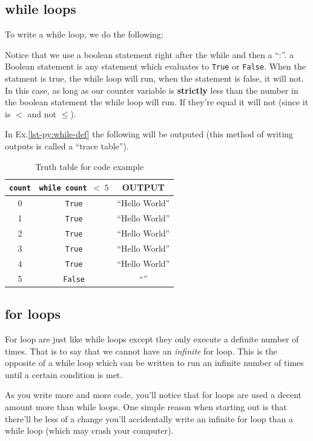 \documentclass[12pt,a4paper]{book}
\begin{document}
				\subsection{while loops}
					To write a while loop, we do the following:
					
					Notice that we use a boolean statement right after the while and then a ``:''. a Boolean statement is any statement which evaluates to \texttt{True} or \texttt{False}. When the statment is true, the while loop will run, when the statement is false, it will not. In this case, as long as our counter variable is \textbf{strictly} less than the number in the boolean statement the while loop will run. If they're equal it will not (since it is $<$ and not $\leq$).
					
					In Ex.\ref{lst-py:while-def} the following will be outputed (this method of writing outputs is called a ``trace table'').
					\begin{table}[H]
						\centering
						\begin{tabular}{c|c|c}
							\texttt{count} & \texttt{while count $< \ 5$} & OUTPUT \\
							\hline
							0 & \texttt{True} & ``Hello World'' \\
							1 & \texttt{True} & ``Hello World'' \\
							2 & \texttt{True} & ``Hello World'' \\
							3 & \texttt{True} & ``Hello World'' \\
							4 & \texttt{True} & ``Hello World'' \\
							5 & \texttt{False} & ``''
						\end{tabular}
						\caption{Truth table for code example}
						\label{tab:while-def-tt}
					\end{table}

				\subsection{for loops}
					For loop are just like while loops except they only execute a definite number of times. That is to say that we cannot have an \textit{infinite} for loop. This is the opposite of a while loop which can be written to run an infinite number of times until a certain condition is met. 
					
					As you write more and more code, you'll notice that for loops are used a decent amount more than while loops. One simple reason when starting out is that there'll be less of a change you'll accidentally write an infinite for loop than a while loop (which may crash your computer). 
					
\end{document}
